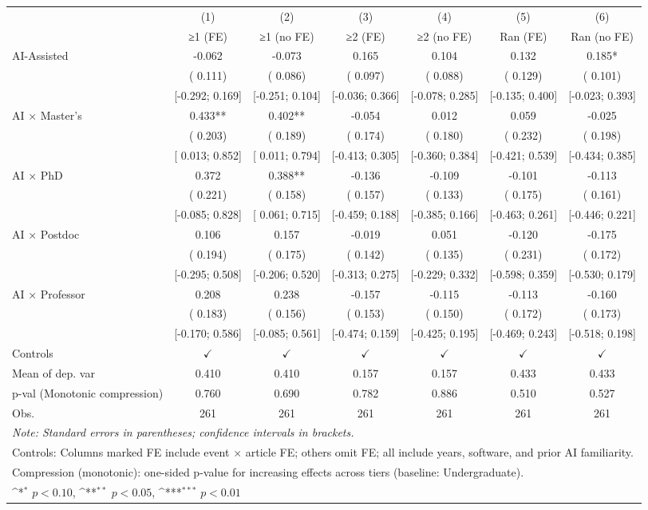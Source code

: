 \def\sym#1{\ifmmode^{#1}\else\(^{#1}\)\fi}
\begin{tabular}{l*{6}{c}}
\hline\hline
 & (1) & (2) & (3) & (4) & (5) & (6)
\\
 & ≥1 (FE) & ≥1 (no FE) & ≥2 (FE) & ≥2 (no FE) & Ran (FE) & Ran (no FE)
 \\
\hline
AI-Assisted & -0.062 & -0.073 &  0.165 &  0.104 &  0.132 &  0.185*
\\
 & ( 0.111) & ( 0.086) & ( 0.097) & ( 0.088) & ( 0.129) & ( 0.101)
\\
 & [-0.292;  0.169] & [-0.251;  0.104] & [-0.036;  0.366] & [-0.078;  0.285] & [-0.135;  0.400] & [-0.023;  0.393]
\\
AI × Master's &  0.433** &  0.402** & -0.054 &  0.012 &  0.059 & -0.025
\\
 & ( 0.203) & ( 0.189) & ( 0.174) & ( 0.180) & ( 0.232) & ( 0.198)
\\
 & [ 0.013;  0.852] & [ 0.011;  0.794] & [-0.413;  0.305] & [-0.360;  0.384] & [-0.421;  0.539] & [-0.434;  0.385]
\\
AI × PhD &  0.372 &  0.388** & -0.136 & -0.109 & -0.101 & -0.113
\\
 & ( 0.221) & ( 0.158) & ( 0.157) & ( 0.133) & ( 0.175) & ( 0.161)
\\
 & [-0.085;  0.828] & [ 0.061;  0.715] & [-0.459;  0.188] & [-0.385;  0.166] & [-0.463;  0.261] & [-0.446;  0.221]
\\
AI × Postdoc &  0.106 &  0.157 & -0.019 &  0.051 & -0.120 & -0.175
\\
 & ( 0.194) & ( 0.175) & ( 0.142) & ( 0.135) & ( 0.231) & ( 0.172)
\\
 & [-0.295;  0.508] & [-0.206;  0.520] & [-0.313;  0.275] & [-0.229;  0.332] & [-0.598;  0.359] & [-0.530;  0.179]
\\
AI × Professor &  0.208 &  0.238 & -0.157 & -0.115 & -0.113 & -0.160
\\
 & ( 0.183) & ( 0.156) & ( 0.153) & ( 0.150) & ( 0.172) & ( 0.173)
\\
 & [-0.170;  0.586] & [-0.085;  0.561] & [-0.474;  0.159] & [-0.425;  0.195] & [-0.469;  0.243] & [-0.518;  0.198]
\\
\hline
Controls & $\checkmark$ & $\checkmark$ & $\checkmark$ & $\checkmark$ & $\checkmark$ & $\checkmark$
\\
Mean of dep. var &  0.410 &  0.410 &  0.157 &  0.157 &  0.433 &  0.433
\\
p-val (Monotonic compression) &  0.760 &  0.690 &  0.782 &  0.886 &  0.510 &  0.527
\\
Obs. & 261 & 261 & 261 & 261 & 261 & 261
\\
\hline
\hline\hline
\multicolumn{7}{l}{\it{Note:} Standard errors in parentheses; confidence intervals in brackets.}\\
\multicolumn{7}{l}{Controls: Columns marked FE include event $\times$ article FE; others omit FE; all include years, software, and prior AI familiarity.}\\
\multicolumn{7}{l}{Compression (monotonic): one-sided p-value for increasing effects across tiers (baseline: Undergraduate).}\\
\multicolumn{7}{l}{\sym{*} $p<0.10$, \sym{**} $p<0.05$,  \sym{***} $p<0.01$}\\
\end{tabular}

